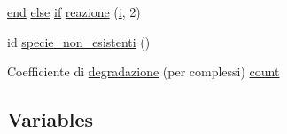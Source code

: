 \begin{DoxyCompactItemize}
$$\item 
\hyperlink{a00025_afb358f48b1646c750fb9da6c6585be2b}{end} \hyperlink{a00031_af5946383720aa572eb93e1e63afc23c2}{else} \hyperlink{a00030_a01d55766b8058903dd360b4bda71f9f5}{if} \hyperlink{a00110_a65cf6e12ba9a8c10222f3f1f71f7c95f}{reazione} (\hyperlink{a00113_ad3efca1ea6e3333daf30719ee0501862}{i}, 2)
\item 
id \hyperlink{a00110_adfcfd2749a68fa87ece8ec3caa194b3d}{specie\-\_\-non\-\_\-esistenti} ()
\item 
Coefficiente di \hyperlink{a00110_a43a55a4e9faae78b56ddd9e7ca41ba42}{degradazione} (per complessi) \hyperlink{a00110_aa0a4866d2600caeb20cfacee8eefc922}{count}
\end{DoxyCompactItemize}
\subsection*{Variables}

